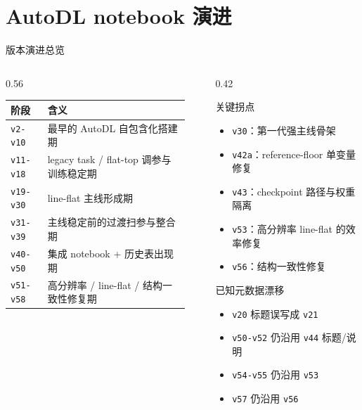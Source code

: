 \documentclass[aspectratio=169,10pt]{ctexbeamer}
\begin{document}
\section{AutoDL notebook 演进}

\begin{frame}{版本演进总览}
  \begin{columns}[T]
    \begin{column}{0.56\textwidth}
      \small
      \begin{tabular}{>{\raggedright\arraybackslash}p{0.19\linewidth} >{\raggedright\arraybackslash}p{0.73\linewidth}}
        \toprule
        阶段 & 含义 \\
        \midrule
        \texttt{v2-v10} & 最早的 AutoDL 自包含化搭建期 \\
        \texttt{v11-v18} & legacy task / flat-top 调参与训练稳定期 \\
        \texttt{v19-v30} & line-flat 主线形成期 \\
        \texttt{v31-v39} & 主线稳定前的过渡扫参与整合期 \\
        \texttt{v40-v50} & 集成 notebook + 历史表出现期 \\
        \texttt{v51-v58} & 高分辨率 / line-flat / 结构一致性修复期 \\
        \bottomrule
      \end{tabular}
    \end{column}
    \begin{column}{0.42\textwidth}
      \small
      \begin{block}{关键拐点}
        \begin{itemize}
          \item \texttt{v30}：第一代强主线骨架
          \item \texttt{v42a}：reference-floor 单变量修复
          \item \texttt{v43}：checkpoint 路径与权重隔离
          \item \texttt{v53}：高分辨率 line-flat 的效率修复
          \item \texttt{v56}：结构一致性修复
        \end{itemize}
      \end{block}
      \begin{alertblock}{已知元数据漂移}
        \begin{itemize}
          \item \texttt{v20} 标题误写成 \texttt{v21}
          \item \texttt{v50-v52} 仍沿用 \texttt{v44} 标题/说明
          \item \texttt{v54-v55} 仍沿用 \texttt{v53}
          \item \texttt{v57} 仍沿用 \texttt{v56}
        \end{itemize}
      \end{alertblock}
    \end{column}
  \end{columns}
\end{frame}
\end{document}
